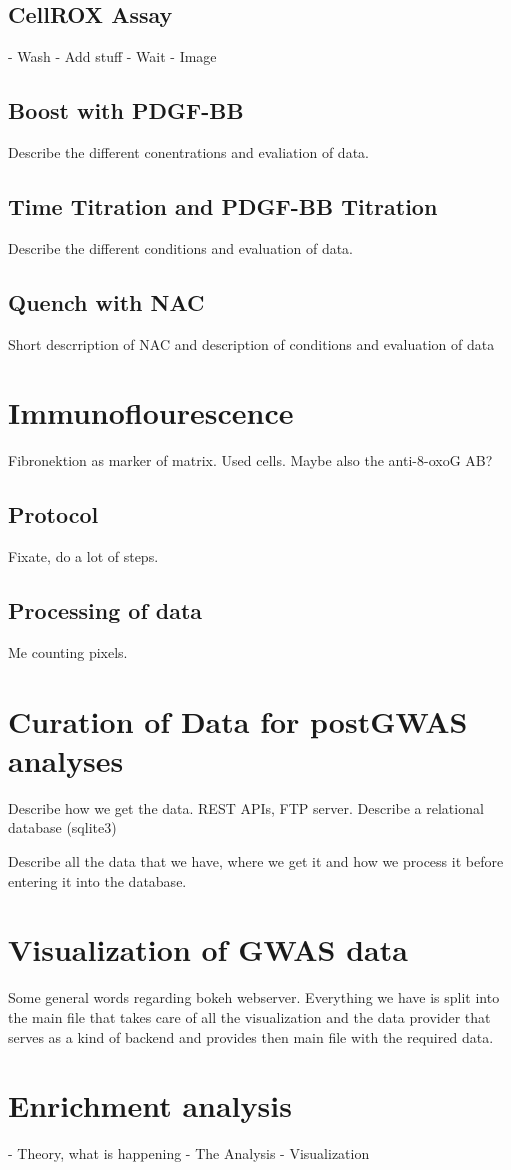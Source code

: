     \subsection{CellROX Assay}
    - Wash
    - Add stuff
    - Wait
    - Image

    \subsection{Boost with PDGF-BB}
    Describe the different conentrations and evaliation of data.

    \subsection{Time Titration and PDGF-BB Titration}
    Describe the different conditions and evaluation of data.

    \subsection{Quench with NAC}
    Short descrription of NAC and description of conditions and evaluation of data

\section{Immunoflourescence}
\label{sec:if}
Fibronektion as marker of matrix. Used cells.
Maybe also the anti-8-oxoG AB?

    \subsection{Protocol}
    Fixate, do a lot of steps.

    \subsection{Processing of data}
    Me counting pixels.

\section{Curation of Data for postGWAS analyses}
\label{sec:database}
Describe how we get the data. REST APIs, FTP server.
Describe a relational database (sqlite3)

Describe all the data that we have, where we get it and how we process it before entering it into the database.

\section{Visualization of GWAS data}
\label{sec:gwas_vis}
Some general words regarding bokeh webserver.
Everything we have is split into the main file that takes care of all the visualization and the data provider that serves as a kind of backend and provides then main file with the required data.

\section{Enrichment analysis}
\label{sec:enrichment}
- Theory, what is happening
- The Analysis
- Visualization
